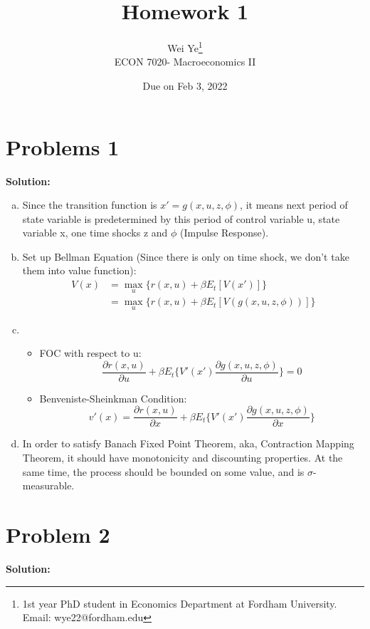\documentclass[11pt]{article} %
\title{Homework 1}
\author{Wei Ye\footnote{ 1st year PhD student in Economics Department at Fordham University. Email: wye22@fordham.edu}
    \\ ECON 7020- Macroeconomics II}
\date{Due on Feb 3, 2022}
\begin{document}
\maketitle

\section{Problems 1}
\textbf{Solution:}

\begin{enumerate}[a.]
	\item Since the transition function is $x'=g(x,u,z,\phi)$, it means next period of state variable is predetermined by this period of control variable u, state variable  x, one time shocks  z and $\phi$ (Impulse Response). 
	\item Set up Bellman Equation (Since there is only on time shock, we don't take them into value function):
		\begin{align*}
			V(x)&=\max_u\{r(x,u)+\beta E_t[V(x')]\}\\
				&= \max_u\{r(x,u)+\beta E_t[V(g(x,u,z,\phi))]\}
		\end{align*}
	\item \begin{itemize}
		\item FOC with respect to u:
		\begin{equation*}
			\frac{\partial r(x,u)}{\partial u}+\beta E_t\{V'(x')\frac{\partial g(x,u,z,\phi)}{\partial u}\}=0
		\end{equation*}
		\item Benveniste-Sheinkman Condition:
		\begin{equation*}
			v'(x)=\frac{\partial r(x,u)}{\partial x}+\beta E_t\{V'(x')\frac{\partial g(x,u,z,\phi)}{\partial x}\}
		\end{equation*}
	\end{itemize}
	\item In order to satisfy Banach Fixed Point Theorem, aka, Contraction Mapping Theorem, it should have monotonicity and discounting properties.
	At the same time, the process should be bounded on some value, and  is $\sigma$-measurable.
\end{enumerate}



\section{Problem 2}
\textbf{Solution:}
\end{document}

